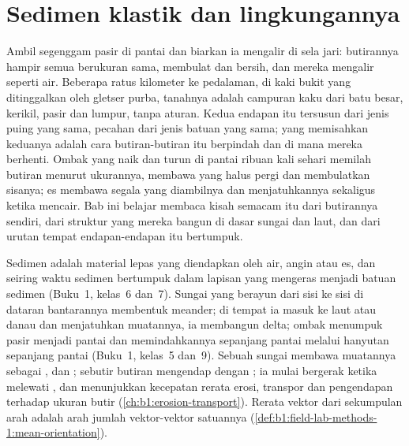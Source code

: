 \chapter{Sedimen klastik dan lingkungannya}\label{ch:b1:clastic-sediments}

Ambil segenggam pasir di pantai dan biarkan ia mengalir di sela jari: butirannya hampir semua berukuran sama, membulat dan bersih, dan mereka mengalir seperti air. Beberapa ratus kilometer ke pedalaman, di kaki bukit yang ditinggalkan oleh gletser purba, tanahnya adalah campuran kaku dari batu besar, kerikil, pasir dan lumpur, tanpa aturan. Kedua endapan itu tersusun dari jenis puing yang sama, pecahan dari jenis batuan yang sama; yang memisahkan keduanya adalah cara butiran-butiran itu berpindah dan di mana mereka berhenti. Ombak yang naik dan turun di pantai ribuan kali sehari memilah butiran menurut ukurannya, membawa yang halus pergi dan membulatkan sisanya; es membawa segala yang diambilnya dan menjatuhkannya sekaligus ketika mencair. Bab ini belajar membaca kisah semacam itu dari butirannya sendiri, dari struktur yang mereka bangun di dasar sungai dan laut, dan dari urutan tempat endapan-endapan itu bertumpuk.

\begin{recall}
Sedimen adalah material lepas yang diendapkan oleh air, angin atau es, dan seiring waktu sedimen bertumpuk dalam lapisan yang mengeras menjadi batuan sedimen (Buku~1, kelas~6 dan~7). Sungai yang berayun dari sisi ke sisi di dataran bantarannya membentuk meander; di tempat ia masuk ke laut atau danau dan menjatuhkan muatannya, ia membangun delta; ombak menumpuk pasir menjadi pantai dan memindahkannya sepanjang pantai melalui hanyutan sepanjang pantai (Buku~1, kelas~5 dan~9). Sebuah sungai membawa muatannya sebagai ,  dan ; sebutir butiran mengendap dengan ; ia mulai bergerak ketika  melewati , dan  menunjukkan kecepatan rerata erosi, transpor dan pengendapan terhadap ukuran butir (\cref{ch:b1:erosion-transport}). Rerata vektor dari sekumpulan arah adalah arah jumlah vektor-vektor satuannya (\cref{def:b1:field-lab-methods-1:mean-orientation}).
\end{recall}

